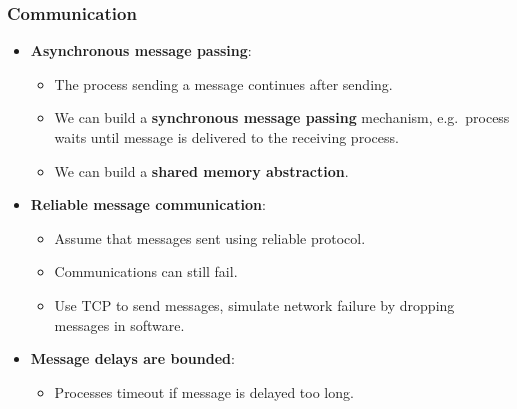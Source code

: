 \documentclass[11pt]{article}
\begin{document}
\subsubsection{Communication}
\begin{itemize}
  \item \textbf{Asynchronous message passing}:
    \begin{itemize}
      \item The process sending a message continues after sending.
      \item We can build a \textbf{synchronous message passing} mechanism, e.g.\ process waits until message is delivered to the receiving process.
      \item We can build a \textbf{shared memory abstraction}.
    \end{itemize}
  \item \textbf{Reliable message communication}:
    \begin{itemize}
      \item Assume that messages sent using reliable protocol.
      \item Communications can still fail.
      \item Use TCP to send messages, simulate network failure by dropping messages in software.
    \end{itemize}
  \item \textbf{Message delays are bounded}:
    \begin{itemize}
      \item Processes timeout if message is delayed too long.
    \end{itemize}
\end{itemize}
\end{document}
